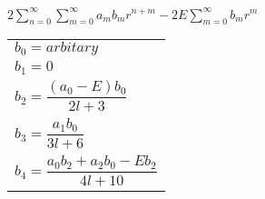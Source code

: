 \documentclass{jarticle}%
\begin{document}
$2%
{\displaystyle\sum\limits_{n=0}^{\infty}}
{\displaystyle\sum\limits_{m=0}^{\infty}}
a_{m}b_{m}r^{n+m}-2E%
{\displaystyle\sum\limits_{m=0}^{\infty}}
b_{m}r^{m}$%

\begin{tabular}
[c]{l}%
$b_{0}=arbitary$\\
$b_{1}=0$\\
$b_{2}=\dfrac{\left(  a_{0}-E\right)  b_{0}}{2l+3}$\\
$b_{3}=\dfrac{a_{1}b_{0}}{3l+6}$\\
$b_{4}=\dfrac{a_{0}b_{2}+a_{2}b_{0}-Eb_{2}}{4l+10}$%
\end{tabular}
\end{document}

